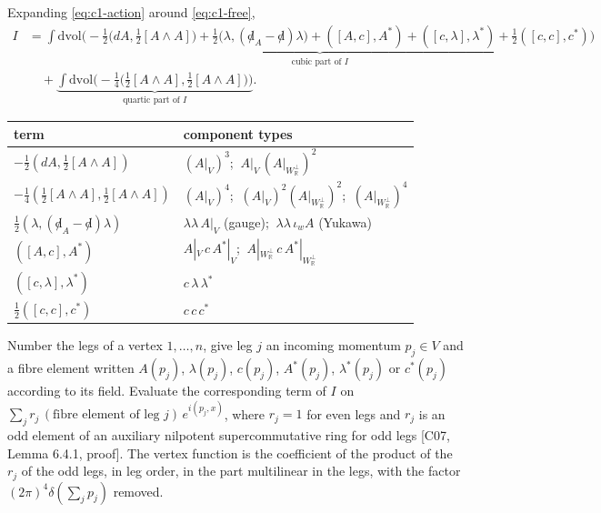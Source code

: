 Expanding \eqref{eq:c1-action} around \eqref{eq:c1-free},
\begin{equation}
\begin{aligned}
I&=\underbrace{\int\mathrm{dvol}\Big(-\tfrac12\big(dA,\tfrac12[A\wedge A]\big)+\tfrac12\big(\lambda,({\not d}_A-{\not d})\lambda\big)+([A,c],A^*)+([c,\lambda],\lambda^*)+\tfrac12([c,c],c^*)\Big)}_{\text{cubic part of }I}\\
&\quad+\underbrace{\int\mathrm{dvol}\Big(-\tfrac14\big(\tfrac12[A\wedge A],\tfrac12[A\wedge A]\big)\Big)}_{\text{quartic part of }I}.
\end{aligned}
\label{eq:c1-I}
\end{equation}

\begin{tabular}{l|l}
term & component types \\
\hline
$-\frac12(dA,\frac12[A\wedge A])$ & $(A|_V)^3$; $\ A|_V\,(A|_{W_{\mathbb R}^\perp})^2$ \\
$-\frac14(\frac12[A\wedge A],\frac12[A\wedge A])$ & $(A|_V)^4$; $\ (A|_V)^2(A|_{W_{\mathbb R}^\perp})^2$; $\ (A|_{W_{\mathbb R}^\perp})^4$ \\
$\frac12(\lambda,({\not d}_A-{\not d})\lambda)$ & $\lambda\lambda\,A|_V$ (gauge); $\ \lambda\lambda\,\iota_wA$ (Yukawa) \\
$([A,c],A^*)$ & $A|_V\,c\,A^*|_V$; $\ A|_{W_{\mathbb R}^\perp}\,c\,A^*|_{W_{\mathbb R}^\perp}$ \\
$([c,\lambda],\lambda^*)$ & $c\,\lambda\,\lambda^*$ \\
$\frac12([c,c],c^*)$ & $c\,c\,c^*$ \\
\end{tabular}

\begin{definition}
\label{def:c1-vertex}
Number the legs of a vertex $1,\dots,n$, give leg $j$ an incoming momentum $p_j\in V$ and a fibre element written $A(p_j)$, $\lambda(p_j)$, $c(p_j)$, $A^*(p_j)$, $\lambda^*(p_j)$ or $c^*(p_j)$ according to its field. Evaluate the corresponding term of $I$ on $\sum_j r_j\,(\text{fibre element of leg }j)\,e^{i(p_j,x)}$, where $r_j=1$ for even legs and $r_j$ is an odd element of an auxiliary nilpotent supercommutative ring for odd legs [C07, Lemma 6.4.1, proof]. The vertex function is the coefficient of the product of the $r_j$ of the odd legs, in leg order, in the part multilinear in the legs, with the factor $(2\pi)^4\delta(\sum_jp_j)$ removed.
\end{definition}

